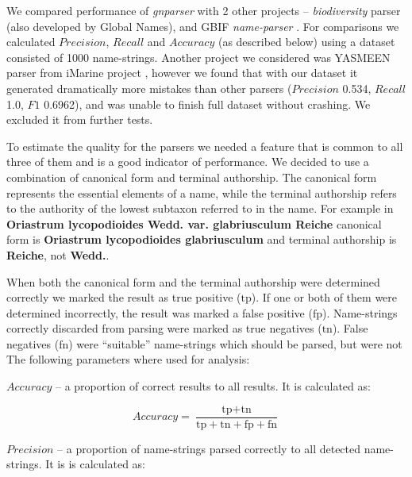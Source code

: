 \documentclass{bmcart}
\begin{document}
We compared performance of \textit{gnparser} with 2 other projects --
\textit{biodiversity} parser \cite{Boyle2013, biodiversity} (also developed by
Global Names), and GBIF \textit{name-parser} \cite{gbifNameParser}. For
comparisons we calculated $Precision$, $Recall$ and $Accuracy$ (as described
below) using a dataset consisted of 1000 name-strings. Another project we
considered was YASMEEN parser from iMarine project \cite{VandenBerghe2015},
however we found that with our dataset it generated dramatically more mistakes
than other parsers ($Precision$ 0.534, $Recall$ 1.0, $F1$ 0.6962), and was
unable to finish full dataset without crashing. We excluded it from further
tests.


To estimate the quality for the parsers we needed a feature that is common to
all three of them and is a good indicator of performance.  We decided to use a
combination of canonical form and terminal authorship.  The canonical form
represents the essential elements of a name, while the terminal authorship
refers to the authority of the lowest subtaxon  referred to in the name. For
example in \textbf{Oriastrum lycopodioides Wedd.  var.  glabriusculum Reiche}
canonical form is \textbf{Oriastrum lycopodioides glabriusculum} and terminal
authorship is \textbf{Reiche}, not \textbf{Wedd.}.

When both the canonical form and the terminal authorship were determined
correctly we marked the result as true positive ($\text{tp}$).  If one or both
of them were determined incorrectly, the result was marked a false positive
($\text{fp}$). Name-strings correctly discarded from parsing were marked as
true negatives ($\text{tn}$). False negatives ($\text{fn}$) were ``suitable''
name-strings which should be parsed, but were not The
following parameters where used for analysis:

$Accuracy$ -- a proportion of correct results to all results.  It is calculated
as:

\[Accuracy = \dfrac{\text{tp} + \text{tn}}
  {\text{tp} + \text{tn} + \text{fp} + \text{fn}}\]

$Precision$ -- a proportion of name-strings parsed correctly to all detected
name-strings. It is is calculated as:
\end{document}

